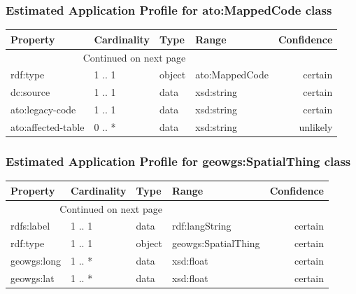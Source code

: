\documentclass[10pt,a4paper,titlepage,final]{article}
\begin{document}
\subsubsection{Estimated Application Profile for ato:MappedCode class}
\begin{tabularx}{\textwidth}{lllXr}
\toprule
           Property & Cardinality &    Type &           Range & Confidence \\
\midrule
\endhead
\midrule
\multicolumn{3}{r}{{Continued on next page}} \\
\midrule
\endfoot

\bottomrule
\endlastfoot
           rdf:type &      1 .. 1 &  object &  ato:MappedCode &    certain \\
          dc:source &      1 .. 1 &    data &      xsd:string &    certain \\
    ato:legacy-code &      1 .. 1 &    data &      xsd:string &    certain \\
 ato:affected-table &      0 .. * &    data &      xsd:string &   unlikely \\
\end{tabularx}


\subsubsection{Estimated Application Profile for geowgs:SpatialThing class}
\begin{tabularx}{\textwidth}{lllXr}
\toprule
    Property & Cardinality &    Type &                Range & Confidence \\
\midrule
\endhead
\midrule
\multicolumn{3}{r}{{Continued on next page}} \\
\midrule
\endfoot

\bottomrule
\endlastfoot
  rdfs:label &      1 .. 1 &    data &       rdf:langString &    certain \\
    rdf:type &      1 .. 1 &  object &  geowgs:SpatialThing &    certain \\
 geowgs:long &      1 .. * &    data &            xsd:float &    certain \\
  geowgs:lat &      1 .. * &    data &            xsd:float &    certain \\
\end{tabularx}
\end{document}
